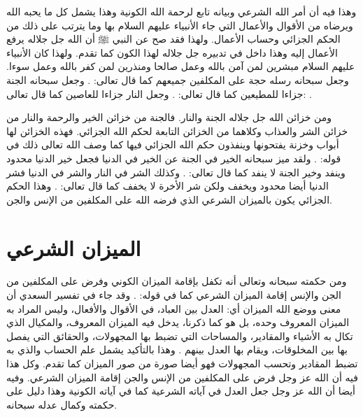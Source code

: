 وهذا فيه أن أمر الله الشرعي وبيانه تابع لرحمة الله الكونية وهذا يشمل كل ما يحبه الله ويرضاه من الأقوال والأعمال التي جاء الأنبياء عليهم السلام بها وما يترتب على ذلك من الحكم الجزائي وحساب الأعمال. ولهذا فقد صح عن النبي ﷺ أن الله جل جلاله يرفع الأعمال إليه وهذا داخل في تدبيره جل جلاله لهذا الكون كما تقدم. ولهذا كان الأنبياء عليهم السلام مبشرين لمن آمن بالله وعمل صالحا ومنذرين لمن كفر بالله وعمل سوءا. وجعل سبحانه رسله حجة على المكلفين جميعهم كما قال تعالى: \quranayah*[4][165]{\footnotesize \surahname*[4]}. وجعل سبحانه الجنة جزاءا للمطيعين كما قال تعالى: 
\quranayah*[3][133]{\footnotesize \surahname*[3]}.
وجعل النار جزاءا للعاصين كما قال تعالى: 
\quranayah*[3][131]{\footnotesize \surahname*[3]}.

ومن خزائن الله جل جلاله الجنة والنار. فالجنة من خزائن الخير والرحمة والنار من خزائن الشر والعذاب وكلاهما من الخزائن التابعة لحكم الله الجزائي. فهذه الخزائن لها أبواب وخزنة يفتحونها وينفذون حكم الله الجزائي فيها كما وصف الله تعالى ذلك في قوله: 
\quranayah*[39][71-74]{\footnotesize \surahname*[39]}. ولقد ميز سبحانه الخير في الجنة عن الخير في الدنيا فجعل خير الدنيا محدود وينفد وخير الجنة لا ينفد كما قال تعالى: 
\quranayah*[16][96]{\footnotesize \surahname*[16]}.
وكذلك الشر في النار والشر في الدنيا فشر الدنيا أيضا محدود ويخفف ولكن شر الأخرة لا يخفف كما قال تعالى: 
\quranayah*[2][162]{\footnotesize \surahname*[2]}. وهذا الحكم الجزائي يكون بالميزان الشرعي الذي فرضه الله على المكلفين من الإنس والجن. 


\section{الميزان الشرعي}

ومن حكمته سبحانه وتعالى أنه تكفل بإقامة الميزان الكوني وفرض على المكلفين من الجن والإنس إقامة الميزان الشرعي كما في قوله:
\quranayah*[55][7-9]{\footnotesize \surahname*[55]}. وقد جاء في تفسير السعدي أن معنى ووضع الله الميزان أي: العدل بين العباد، في الأقوال والأفعال، وليس المراد به الميزان المعروف وحده، بل هو كما ذكرنا، يدخل فيه الميزان المعروف، والمكيال الذي تكال به الأشياء والمقادير، والمساحات التي تضبط بها المجهولات، والحقائق التي يفصل بها بين المخلوقات، ويقام بها العدل بينهم \cite{tafsir_Saadi}. وهذا بالتأكيد يشمل علم الحساب والذي به تضبط المقادير وتحسب المجهولات فهو أيضا صورة من صور الميزان كما تقدم. وكل هذا فيه أن الله عز وجل فرض على المكلفين من الإنس والجن إقامة الميزان الشرعي. وفيه أيضا أن الله عز وجل جعل العدل في آياته الشرعية كما في آياته الكونية وهذا دليل على حكمته وكمال عدله سبحانه.

